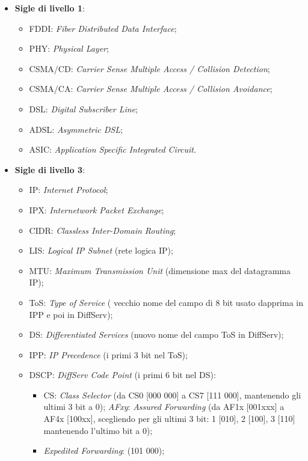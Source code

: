 \begin{itemize}
\begin{itemize}
\end{itemize}

\item{\textbf{Sigle di livello 1}}:

\begin{itemize}

\item{FDDI}: \emph{Fiber Distributed Data Interface};
\item{PHY}: \emph{Physical Layer};
\item{CSMA/CD}: \emph{Carrier Sense Multiple Access / Collision Detection};
\item{CSMA/CA}: \emph{Carrier Sense Multiple Access / Collision Avoidance};
\item{DSL}: \emph{Digital Subscriber Line};
\item{ADSL}: \emph{Asymmetric DSL};
\item{ASIC}: \emph{Application Specific Integrated Circuit}.

\end{itemize}

\item{\textbf{Sigle di livello 3}}:

\begin{itemize}

\item{IP}: \emph{Internet Protocol};
\item{IPX}: \emph{Internetwork Packet Exchange};
\item{CIDR}: \emph{Classless Inter-Domain Routing};
\item{LIS}: \emph{Logical IP Subnet} (rete logica IP);
\item{MTU}: \emph{Maximum Transmission Unit} (dimensione max del datagramma IP);
\item{ToS}: \emph{Type of Service} ( vecchio nome del campo di 8 bit usato dapprima in IPP e poi in DiffServ);
\item{DS}: \emph{Differentiated Services} (nuovo nome del campo ToS in DiffServ);
\item{IPP}: \emph{IP Precedence} (i primi 3 bit nel ToS);
\item{DSCP}: \emph{DiffServ Code Point} (i primi 6 bit nel DS):

\begin{itemize}

\item{CS}: \emph{Class Selector} (da CS0 [000 000] a CS7 [111 000], mantenendo gli ultimi 3 bit a 0);
\emph{AFxy}: \emph{Assured Forwarding} (da AF1x [001xxx] a AF4x [100xx], scegliendo per gli ultimi 3 bit: 1 [010], 2 [100], 3 [110] mantenendo l’ultimo bit a 0);
\item{\emph{Expedited Forwarding}}: (101 000);


\end{itemize}
\end{itemize}
\end{itemize}
